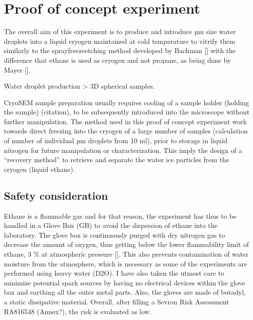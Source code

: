 \documentclass[letterpaper,10pt,english]{jupyterBook}
\begin{document}
\section{Proof of concept experiment}
\label{\detokenize{Chapter6/Chapter6:proof-of-concept-experiment}}
\sphinxAtStartPar
The overall aim of this experiment is to produce and introduce µm size water droplets into a liquid cryogen maintained at cold temperature to vitrify them similarly to the spray\sphinxhyphen{}freeze\sphinxhyphen{}etching method developed by Bachman {[}{]} with the difference that ethane is used as cryogen and not propane, as being done by Mayer {[}{]}.

\sphinxAtStartPar
Water droplet production \sphinxhyphen{}> 3D spherical samples.

\sphinxAtStartPar
Cryo\sphinxhyphen{}SEM sample preparation usually requires cooling of a sample holder (holding the sample) (citation), to be subsequently introduced into the microscope without further manipulation. The method used in this proof of concept experiment work towards direct freezing into the cryogen of a large number of samples (calculation of number of individual µm droplets from 10 ml), prior to storage in liquid nitrogen for future manipulation or characterization. This imply the design of a “recovery method” to retrieve and separate the water ice particles from the cryogen (liquid ethane).


\subsection{Safety consideration}
\label{\detokenize{Chapter6/Chapter6:safety-consideration}}
\sphinxAtStartPar
Ethane is a flammable gas and for that reason, the experiment has thus to be handled in a Glove Box (GB) to avoid the dispersion of ethane into the laboratory. The glove box is continuously purged with dry nitrogen gas to decrease the amount of oxygen, thus getting below the lower flammability limit of ethane, 3 \% at atmospheric pressure {[}{]}. This also prevents contamination of water moisture from the atmosphere, which is necessary as some of the experiments are performed using heavy water (D2O). I have also taken the utmost care to minimize potential spark sources by having no electrical devices within the glove box and earthing all the outer metal parts. Also, the gloves are made of butadyl, a static dissipative material. Overall, after filling a Sevron Risk Assessment RA816548 (Annex?), the risk is evaluated as low.
\end{document}
